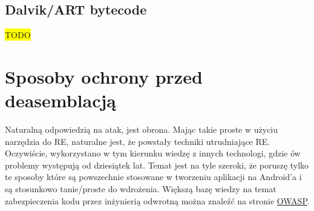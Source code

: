 \documentclass[12pt,a4paper,leqno,oneside,titlepage]{book}
\newcommand{\todo}[1]{\colorbox{yellow}{#1}}
\begin{document}
\section{Dalvik/ART bytecode}
\todo{TODO}

\chapter{Sposoby ochrony przed deasemblacją}
Naturalną odpowiedzią na atak, jest obrona. Mając takie proste w użyciu narzędzia do RE, naturalne jest, że powstały techniki utrudniające RE. Oczywiście, wykorzystano w tym kierunku wiedzę z innych technologi, gdzie ów problemy występują od dziesiątek lat. Temat jest na tyle szeroki, że poruszę tylko te sposoby które są powszechnie stosowane w tworzeniu aplikacji na Android'a i są stosunkowo tanie/proste do wdrożenia. Większą bazę wiedzy na temat zabezpieczenia kodu przez inżynierią odwrotną można znaleźć na stronie \hyperlink{https://www.owasp.org/index.php/OWASP_Reverse_Engineering_and_Code_Modification_Prevention_Project}{OWASP}.
\end{document}
